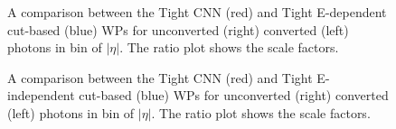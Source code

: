 \begin{figure}[ht]
    \centering
    \caption{A comparison between the Tight CNN (red) and Tight E-dependent cut-based  (blue) WPs for unconverted (right) converted (left) photons in bin of $|\eta|$. The ratio plot shows the scale factors.}
    \label{Eff:Tight:Dep}
\end{figure}
\begin{figure}[ht]
    \centering
    \caption{A comparison between the Tight CNN (red) and Tight E-independent cut-based  (blue) WPs for unconverted (right) converted (left) photons in bin of $|\eta|$. The ratio plot shows the scale factors.}
    \label{Eff:Tight:Inc}
\end{figure}

